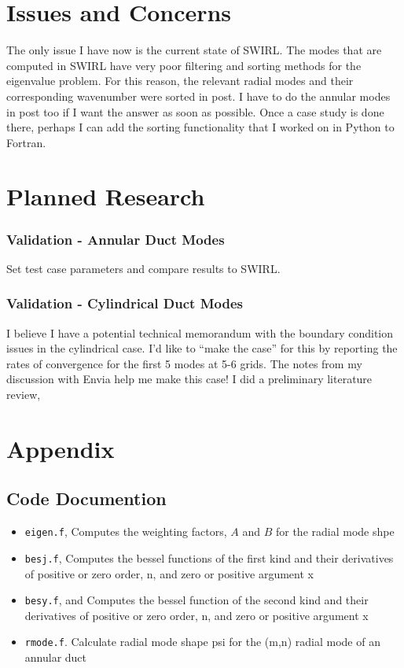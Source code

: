 \documentclass[12pt]{article}
\begin{document}
\section{Issues and Concerns}
The only issue I have now is the current state of SWIRL. The modes that are 
computed in SWIRL have very poor filtering and sorting methods for the eigenvalue 
problem. For this reason, the relevant radial modes and their corresponding wavenumber 
were sorted in post. I have to do the annular modes in post too if I want the 
answer as soon as possible. Once a case study is done there, perhaps I can add the 
sorting functionality that I worked on in Python to Fortran.



\section{Planned Research} 
\subsubsection{Validation - Annular Duct Modes}
Set test case parameters and compare results to SWIRL.
\subsubsection{Validation - Cylindrical Duct Modes}

I believe I have a potential technical memorandum with the boundary condition issues 
in the cylindrical case. I'd like to ``make the case'' for this by reporting the 
rates of convergence for the first 5 modes at 5-6 grids. The notes from my discussion
with Envia help me make this case! I did a preliminary literature review, 
\cite{meyer1996aeroacoustic}
\section{Appendix}

\subsection{Code Documention}

\begin{itemize}
    \item \verb|eigen.f|, 
        \subitem Computes the weighting factors, $A$ and $B$ for the radial mode
        shpe
    \item \verb|besj.f|, 
        \subitem Computes the bessel functions of the first kind and their derivatives
        of positive or zero order, n, and zero or positive argument x 
    \item \verb|besy.f|, and 
        \subitem Computes the bessel function of the second kind and their 
        derivatives of positive or zero order, n, and zero or positive argument x 
    \item \verb|rmode.f|. 
        \subitem Calculate radial mode shape psi for the (m,n) radial mode of an annular duct 
\end{itemize}
\end{document}
